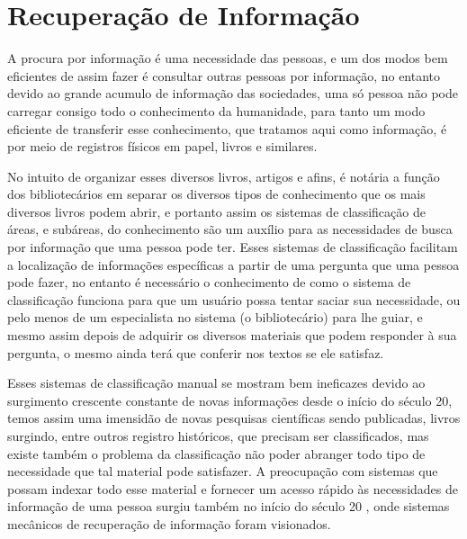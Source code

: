 \section{Recuperação de Informação} \label{sec:RecuperaçãoInformação}




A procura por informação é uma necessidade das pessoas, e um dos modos bem eficientes de assim fazer é consultar outras pessoas por informação, no entanto devido ao grande acumulo de informação das sociedades, uma só pessoa não pode carregar consigo todo o conhecimento da humanidade, para tanto um modo eficiente de transferir esse conhecimento, que tratamos aqui como informação, é por meio de registros físicos em papel, livros e similares.

No intuito de organizar esses diversos livros, artigos e afins, é notária a função dos bibliotecários em separar os diversos tipos de conhecimento que os mais diversos livros podem abrir, e portanto assim os sistemas de classificação de áreas, e subáreas, do conhecimento são um auxílio para as necessidades de busca por informação que uma pessoa pode ter. Esses sistemas de classificação facilitam a localização de informações específicas a partir de uma pergunta que uma pessoa pode fazer, no entanto é necessário o conhecimento de como o sistema de classificação funciona para que um usuário possa tentar saciar sua necessidade, ou pelo menos de um especialista no sistema (o bibliotecário) para lhe guiar, e mesmo assim depois de adquirir os diversos materiais que podem responder à sua pergunta, o mesmo ainda terá que conferir nos textos se ele satisfaz.


Esses sistemas de classificação manual se mostram bem ineficazes devido ao surgimento crescente constante de novas informações desde o início do século 20, temos assim uma imensidão de novas pesquisas científicas sendo publicadas, livros surgindo, entre outros registro históricos, que precisam ser classificados, mas existe também o problema da classificação não poder abranger todo tipo de necessidade que tal material pode satisfazer. 
A preocupação com sistemas que possam indexar todo esse material e fornecer um acesso rápido às necessidades de informação de uma pessoa surgiu também no início do século 20 \cite{Bush:1979:WMT:1113634.1113638}, onde sistemas mecânicos de recuperação de informação foram visionados.


